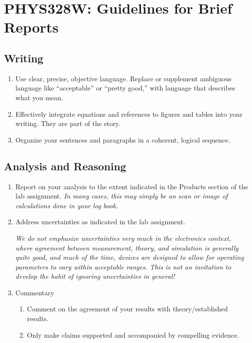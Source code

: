 \documentclass[11 pt]{article}
\begin{document}
\section*{PHYS328W: Guidelines for Brief Reports}

\subsection*{Writing}
\begin{enumerate}
\item Use clear, precise, objective language. Replace or supplement
  ambiguous language like ``acceptable'' or ``pretty good,'' with
  language that describes what you mean.

\item Effectively integrate equations and references to figures and
  tables into your writing. They are part of the story. 

\item Organize your sentences and paragraphs in a coherent, logical
  sequence. 
\end{enumerate}

\subsection*{Analysis and Reasoning}
\begin{enumerate}
\item Report on your analysis to the extent indicated in the
  Products section of the lab assignment. \emph{In many cases, this
    may simply be an scan or image of calculations done in your log
    book.}

\item Address uncertainties as indicated in the lab
  assignment.

  \emph{We do not emphasize uncertainties very much in the
    electronics context, where agreement between measurement,
    theory, and simulation is generally quite good, and much of the
    time, devices are designed to allow for operating parameters to
    vary within acceptable ranges. This is not an invitation to
    develop the habit of ignoring uncertainties in general!}
  
\item Commentary
  \begin{enumerate}
  \item Comment on the agreement of your results with
    theory/established results.
    
  \item Only make claims supported and accompanied by compelling
    evidence.
  \end{enumerate}

\end{enumerate}
\end{document}
